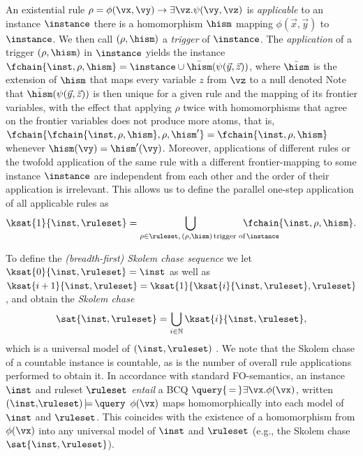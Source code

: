 \medskip {}
An existential rule $\rho = \phi(\vx,\vy) \rightarrow \exists \vz. \psi(\vy,\vz)$ is \emph{applicable} to an instance $\instance$ \ifandonlyif there is a homomorphism $\hism$ mapping $\phi(\vec{x},\vec{y})$ to $\instance$. We then call $(\rho, \hism)$ a \emph{trigger} of $\instance$.
The \emph{application} of a trigger $(\rho, \hism)$ in $\instance$ yields the instance $\fchain{\inst,\rho,\hism} = \instance \cup \bar\hism(\psi(\vec{y},\vec{z}))$, where $\bar\hism$ is the extension of $\hism$ that maps every variable $z$ from $\vz$ to a null denoted  
Note that $\bar\hism(\psi(\vec{y},\vec{z}))$ is then unique for a given rule and the mapping of its frontier variables, with the effect that applying $\rho$ twice with homomorphisms that agree on the frontier variables does not produce more atoms, that is,
$\fchain{\fchain{\inst,\rho,\hism},\rho,\hism'} = \fchain{\inst,\rho,\hism}$ whenever $\hism(\vy) = \hism'(\vy)$. Moreover, applications of different rules or the twofold application of the same rule with a different frontier-mapping to some instance $\instance$ are independent from each other and the order of their application is irrelevant. This allows us to define the parallel one-step application of all applicable rules as 
$$\ksat{1}{\inst,\ruleset} = 
\hspace{-9ex}\bigcup_{\hspace{9ex}\rho\in \ruleset,\,(\rho, \hism) \text{\,trigger of\,} \instance}\hspace{-9ex} 
\fchain{\inst,\rho,\hism}.$$     

To define the \emph{(breadth-first) Skolem chase sequence} we let 
$\ksat{0}{\inst,\ruleset} = \inst$ as well as $\ksat{i+1}{\inst,\ruleset} = \ksat{1}{\ksat{i}{\inst,\ruleset}, \ruleset}$, and obtain the \emph{Skolem chase} $$\sat{\inst,\ruleset} = \bigcup_{i\in \mathbb{N}} \ksat{i}{\inst,\ruleset},$$which is a universal model of $(\inst,\ruleset)$ \cite{fkmp05,marnette09}. We note that the Skolem chase of a countable instance is countable, as  is the number of overall rule applications performed to obtain it. 
%
In accordance with standard FO-semantics, an instance $\inst$ and ruleset $\ruleset$ \emph{entail} a BCQ $\query {\,=\,} \exists \vx .\phi(\vx)$, written $(\inst,\! \ruleset) {\,\models\,} \query$  \iffi $\phi(\vx)$ maps homomorphically into each model of $\inst$ and $\ruleset$. This coincides with  the existence of a homomorphism from $\phi(\vx)$ into any universal model of $\inst$ and $\ruleset$ (e.g., the Skolem chase $\sat{\inst, \ruleset}$).

